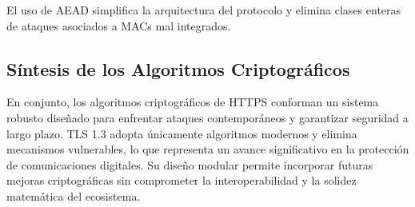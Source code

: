 El uso de AEAD simplifica la arquitectura del protocolo y elimina clases enteras de ataques asociados a MACs mal integrados.

\subsection{Síntesis de los Algoritmos Criptográficos}

En conjunto, los algoritmos criptográficos de HTTPS conforman un sistema robusto diseñado para enfrentar ataques contemporáneos y garantizar seguridad a largo plazo. TLS 1.3 adopta únicamente algoritmos modernos y elimina mecanismos vulnerables, lo que representa un avance significativo en la protección de comunicaciones digitales. Su diseño modular permite incorporar futuras mejoras criptográficas sin comprometer la interoperabilidad y la solidez matemática del ecosistema.

